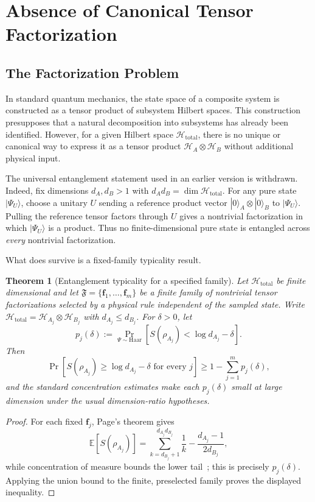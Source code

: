 \documentclass[12pt,a4paper,openany]{book}
\newtheorem{theorem}{Theorem}[chapter]
\begin{document}
\section{Absence of Canonical Tensor Factorization}
\label{H-A-sec:nopref}

\subsection{The Factorization Problem}

In standard quantum mechanics, the state space of a composite system is constructed as a tensor product of subsystem Hilbert spaces. 
This construction presupposes that a natural decomposition into subsystems has already been identified. 
However, for a given Hilbert space $\mathcal{H}_{\text{total}}$, there is no unique or canonical way to express it as a tensor product $\mathcal{H}_A \otimes \mathcal{H}_B$ without additional physical input.

The universal entanglement statement used in an earlier version is withdrawn.  Indeed, fix dimensions $d_A,d_B>1$ with $d_Ad_B=\dim\mathcal H_{\mathrm{total}}$.  For any pure state $|\Psi_U\rangle$, choose a unitary $U$ sending a reference product vector $|0\rangle_A\otimes|0\rangle_B$ to $|\Psi_U\rangle$.  Pulling the reference tensor factors through $U$ gives a nontrivial factorization in which $|\Psi_U\rangle$ is a product.  Thus no finite-dimensional pure state is entangled across \emph{every} nontrivial factorization.

What does survive is a fixed-family typicality result.

\begin{theorem}[Entanglement typicality for a specified family]
\label{H-A-thm:nofact}
Let $\mathcal H_{\mathrm{total}}$ be finite dimensional and let
$\mathfrak F=\{\mathbf f_1,\ldots,\mathbf f_m\}$ be a finite family of
nontrivial tensor factorizations selected by a physical rule independent
of the sampled state.  Write
$\mathcal H_{\mathrm{total}}=\mathcal H_{A_j}\otimes\mathcal H_{B_j}$
with $d_{A_j}\le d_{B_j}$.  For $\delta>0$, let
\[
p_j(\delta):=
\Pr_{\Psi\sim\mathrm{Haar}}
\left[S(\rho_{A_j})<\log d_{A_j}-\delta\right].
\]
Then
\[
\Pr\left[
S(\rho_{A_j})\ge\log d_{A_j}-\delta
\text{ for every }j
\right]
\ge 1-\sum_{j=1}^m p_j(\delta),
\]
and the standard concentration estimates make each $p_j(\delta)$ small
at large dimension under the usual dimension-ratio hypotheses.
\end{theorem}

\begin{proof}
For each fixed $\mathbf f_j$, Page's theorem gives~\cite{Page1993}
\begin{equation}
\label{H-A-eq:page}
\mathbb{E}[S(\rho_{A_j})]
=\sum_{k=d_{B_j}+1}^{d_{A_j}d_{B_j}}\frac1k
-\frac{d_{A_j}-1}{2d_{B_j}},
\end{equation}
while concentration of measure bounds the lower tail~\cite{HaydenLeungWinter2006}; this is precisely $p_j(\delta)$.  Applying the union bound to the finite, preselected family proves the displayed inequality.
\end{proof}
\end{document}
